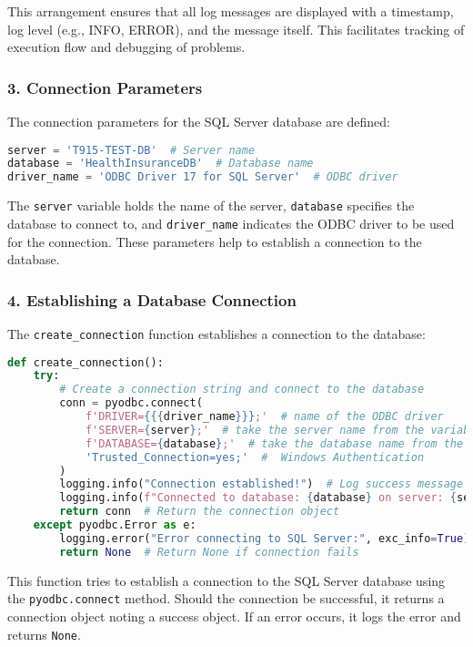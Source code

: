 This arrangement ensures that all log messages are displayed with a timestamp, log level (e.g., INFO, ERROR), and the message itself. This facilitates tracking of execution flow and debugging of problems.

\subsubsection*{3. Connection Parameters}
The connection parameters for the SQL Server database are defined:
\begin{lstlisting}[language=Python]
server = 'T915-TEST-DB'  # Server name
database = 'HealthInsuranceDB'  # Database name
driver_name = 'ODBC Driver 17 for SQL Server'  # ODBC driver
\end{lstlisting}\vspace{.4cm}

The \texttt{server} variable holds the name of the server, \texttt{database} specifies the database to connect to, and \texttt{driver\_name} indicates the ODBC driver to be used for the connection. These parameters help to establish a connection to the database.

\subsubsection*{4. Establishing a Database Connection}
The \texttt{create\_connection} function establishes a connection to the database:
\begin{lstlisting}[language=Python]
def create_connection():
    try:
        # Create a connection string and connect to the database
        conn = pyodbc.connect(
            f'DRIVER={{{driver_name}}};'  # name of the ODBC driver
            f'SERVER={server};'  # take the server name from the variable
            f'DATABASE={database};'  # take the database name from the variable
            'Trusted_Connection=yes;'  #  Windows Authentication 
        )
        logging.info("Connection established!")  # Log success message
        logging.info(f"Connected to database: {database} on server: {server}")  # Log connection details
        return conn  # Return the connection object
    except pyodbc.Error as e:
        logging.error("Error connecting to SQL Server:", exc_info=True)  # Log error message
        return None  # Return None if connection fails
\end{lstlisting}\vspace{.4cm}

This function tries to establish a connection to the SQL Server database using the \texttt{pyodbc.connect} method. Should the connection be successful, it returns a connection object noting a success object. If an error occurs, it logs the error and returns \texttt{None}.


